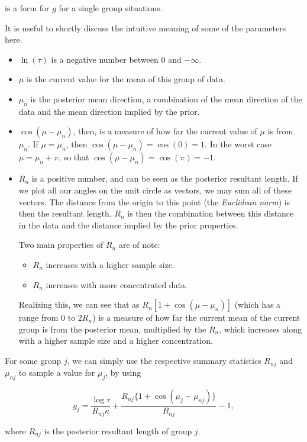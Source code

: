 \documentclass[12pt,a4paper]{article}
\begin{document}
is a form for $g$ for a single group situations. 

It is useful to shortly discuss the intuitive meaning of some of the parameters here. 
\begin{itemize}

\item $\ln(\tau)$ is a negative number between 0 and $-\infty$.
\item $\mu$ is the current value for the mean of this group of data. 
\item $\mu_n$ is the posterior mean direction, a combination of the mean direction of the data and the mean direction implied by the prior. 
\item $\cos(\mu - \mu_n)$, then, is a measure of how far the current value of $\mu$ is from $\mu_n$. If $\mu = \mu_n$, then $\cos(\mu - \mu_n) = \cos(0) = 1$. In the worst case $\mu = \mu_n + \pi$, so that $\cos(\mu - \mu_n) = \cos(\pi) = -1$. 
\item $R_n$ is a positive number, and can be seen as the posterior resultant length. If we plot all our angles on the unit circle as vectors, we may sum all of these vectors. The distance from the origin to this point (the \textit{Euclidean norm}) is then the resultant length. $R_n$ is then the combination between this distance in the data and the distance implied by the prior properties. 

Two main properties of $R_n$ are of note:
	\begin{itemize}
	\item $R_n$ increases with a higher sample size.
	\item $R_n$ increases with more concentrated data.
	\end{itemize}
Realizing this, we can see that as $R_n \left[ 1 +\cos(\mu - \mu_n) \right]$ (which has a range from 0 to $2 R_n$) is a measure of how far the current mean of the current group is from the posterior mean, multiplied by the $R_n$, which increases along with a higher sample size and a higher concentration.  
\end{itemize}

For some group $j$, we can simply use the respective summary statistics $R_{nj}$ and  $\mu_{nj}$ to sample a value for $\mu_j$, by using 

$$ g_j = \frac{\log \tau}{R_{nj} \kappa} + \frac{R_{nj} \{ 1 + \cos (\mu_j - \mu_{nj} ) \} } {R_{nj}} - 1,$$

where $R_{nj}$ is the posterior resultant length of group $j$.
\end{document}
